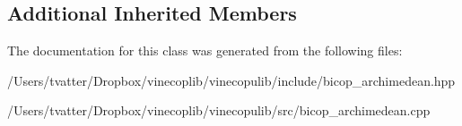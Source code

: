 \subsection*{Additional Inherited Members}


The documentation for this class was generated from the following files\+:\begin{DoxyCompactItemize}
\item 
/\+Users/tvatter/\+Dropbox/vinecoplib/vinecopulib/include/bicop\+\_\+archimedean.\+hpp\item 
/\+Users/tvatter/\+Dropbox/vinecoplib/vinecopulib/src/bicop\+\_\+archimedean.\+cpp\end{DoxyCompactItemize}
